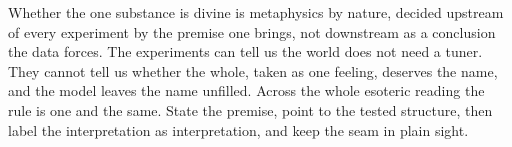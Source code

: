 Whether the one substance is divine is metaphysics by nature, decided upstream of every experiment by the premise one brings, not downstream as a conclusion the data forces. The experiments can tell us the world does not need a tuner. They cannot tell us whether the whole, taken as one feeling, deserves the name, and the model leaves the name unfilled. Across the whole esoteric reading the rule is one and the same. State the premise, point to the tested structure, then label the interpretation as interpretation, and keep the seam in plain sight.
